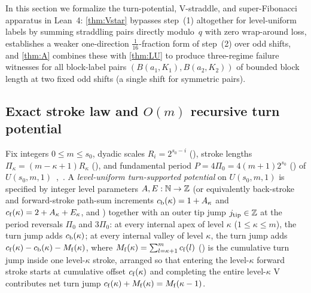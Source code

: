 In this section we formalize the turn-potential, V-straddle, and super-Fibonacci apparatus in Lean~4: \cref{thm:Vstar}
bypasses step~(1) altogether for level-uniform labels by summing straddling pairs directly modulo~$q$ with zero wrap-around
loss,  establishes a weaker one-direction $\tfrac{1}{16}$-fraction form of step~(2)
over odd shifts, and \cref{thm:A} combines these with \cref{thm:LU} to produce three-regime failure witnesses for all
block-label pairs $(B(a_1, K_1), B(a_2, K_2))$ of bounded block length at two fixed odd shifts (a single shift for
symmetric pairs).

\subsection{Exact stroke law and \texorpdfstring{$O(m)$}{O(m)} recursive turn potential}\label{sec:dnp-strokes}

Fix integers $0 \le m \le s_0$, dyadic scales $R_i = 2^{s_0 - i}$ (), stroke lengths $\Pi_\kappa =
(m - \kappa + 1) R_\kappa$ (), and fundamental period $P = 4 \Pi_0 = 4(m+1)2^{s_0}$ () of
$U(s_0, m, 1)$~\cite[Definition~5.3]{FourthPaper2026},~\cite[Section~2.5]{EighthPaper2026}. A \emph{level-uniform turn-supported potential} on
$U(s_0, m, 1)$ is specified by integer level parameters $A, E : \mathbb{N} \to \mathbb{Z}$ (or equivalently back-stroke and forward-stroke
path-sum increments $c_{\mathrm{b}}(\kappa) = 1 + A_\kappa$ and $c_{\mathrm{f}}(\kappa) = 2 + A_\kappa + E_\kappa$, 
and ) together with an outer tip jump $j_{\mathrm{tip}} \in \mathbb{Z}$ at the period reversals $\Pi_0$ and
$3\Pi_0$: at every internal apex of level $\kappa$ ($1 \le \kappa \le m$), the turn jump adds $c_{\mathrm{b}}(\kappa)$; at every
internal valley of level $\kappa$, the turn jump adds $c_{\mathrm{f}}(\kappa) - c_{\mathrm{b}}(\kappa) - M_{\mathrm{f}}(\kappa)$, where
$M_{\mathrm{f}}(\kappa) = \sum_{l = \kappa + 1}^m c_{\mathrm{f}}(l)$ () is the cumulative turn jump inside one
level-$\kappa$ stroke, arranged so that entering the level-$\kappa$ forward stroke starts at cumulative offset
$c_{\mathrm{f}}(\kappa)$ and completing the entire level-$\kappa$ V contributes net turn jump
$c_{\mathrm{f}}(\kappa) + M_{\mathrm{f}}(\kappa) = M_{\mathrm{f}}(\kappa - 1)$.

